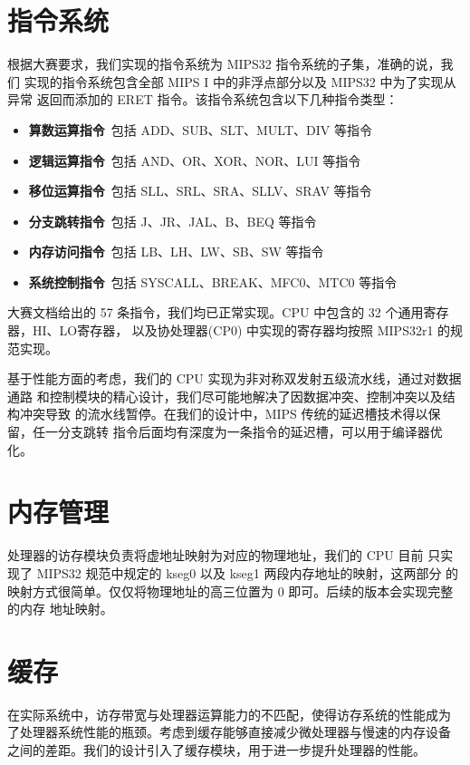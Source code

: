 \documentclass[blue,normal,cn,hide]{elegantbook}
\begin{document}
\section{指令系统}

根据大赛要求，我们实现的指令系统为 MIPS32\cite{MIPS1A}\cite{MIPS2A} 
\cite{MIPS3} 指令系统的子集，准确的说，我们
实现的指令系统包含全部 MIPS I 中的非浮点部分以及 MIPS32 中为了实现从异常
返回而添加的 ERET 指令。该指令系统包含以下几种指令类型：

\begin{itemize}
    \item \textbf{算数运算指令}\ 包括 ADD、SUB、SLT、MULT、DIV 等指令
    \item \textbf{逻辑运算指令}\ 包括 AND、OR、XOR、NOR、LUI 等指令
    \item \textbf{移位运算指令}\ 包括 SLL、SRL、SRA、SLLV、SRAV 等指令
    \item \textbf{分支跳转指令}\ 包括 J、JR、JAL、B、BEQ 等指令
    \item \textbf{内存访问指令}\ 包括 LB、LH、LW、SB、SW 等指令
    \item \textbf{系统控制指令}\ 包括 SYSCALL、BREAK、MFC0、MTC0 等指令
\end{itemize}

大赛文档给出的 57 条指令，我们均已正常实现。CPU 中包含的 32 个通用寄存器，HI、LO寄存器，
以及协处理器(CP0) 中实现的寄存器均按照 MIPS32r1 的规范实现。

基于性能方面的考虑，我们的 CPU 实现为非对称双发射五级流水线，通过对数据通路
和控制模块的精心设计，我们尽可能地解决了因数据冲突、控制冲突以及结构冲突导致
的流水线暂停。在我们的设计中，MIPS 传统的延迟槽技术得以保留，任一分支跳转
指令后面均有深度为一条指令的延迟槽，可以用于编译器优化。

\section{内存管理}

处理器的访存模块负责将虚地址映射为对应的物理地址，我们的 CPU 目前
只实现了 MIPS32 规范中规定的 kseg0 以及 kseg1 两段内存地址的映射，这两部分
的映射方式很简单。仅仅将物理地址的高三位置为 0 即可。后续的版本会实现完整的内存
地址映射。

\section{缓存}

在实际系统中，访存带宽与处理器运算能力的不匹配，使得访存系统的性能成为
了处理器系统性能的瓶颈。考虑到缓存能够直接减少微处理器与慢速的内存设备
之间的差距。我们的设计引入了缓存模块，用于进一步提升处理器的性能。
\end{document}
